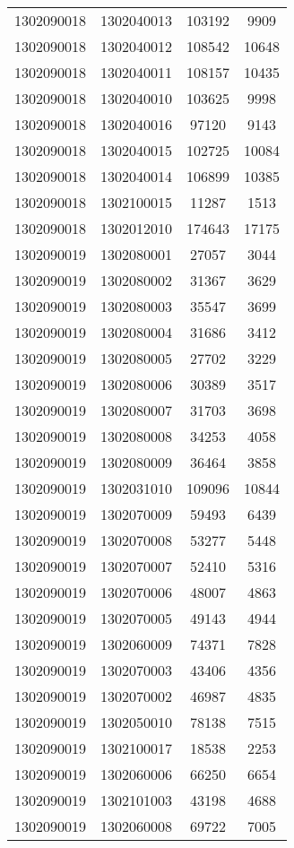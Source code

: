 \begin{longtable}[h]{llcc}
		1302090018 & 1302040013 & 103192 & 9909\\
		1302090018 & 1302040012 & 108542 & 10648\\
		1302090018 & 1302040011 & 108157 & 10435\\
		1302090018 & 1302040010 & 103625 & 9998\\
		1302090018 & 1302040016 & 97120 & 9143\\
		1302090018 & 1302040015 & 102725 & 10084\\
		1302090018 & 1302040014 & 106899 & 10385\\
		1302090018 & 1302100015 & 11287 & 1513\\
		1302090018 & 1302012010 & 174643 & 17175\\
		1302090019 & 1302080001 & 27057 & 3044\\
		1302090019 & 1302080002 & 31367 & 3629\\
		1302090019 & 1302080003 & 35547 & 3699\\
		1302090019 & 1302080004 & 31686 & 3412\\
		1302090019 & 1302080005 & 27702 & 3229\\
		1302090019 & 1302080006 & 30389 & 3517\\
		1302090019 & 1302080007 & 31703 & 3698\\
		1302090019 & 1302080008 & 34253 & 4058\\
		1302090019 & 1302080009 & 36464 & 3858\\
		1302090019 & 1302031010 & 109096 & 10844\\
		1302090019 & 1302070009 & 59493 & 6439\\
		1302090019 & 1302070008 & 53277 & 5448\\
		1302090019 & 1302070007 & 52410 & 5316\\
		1302090019 & 1302070006 & 48007 & 4863\\
		1302090019 & 1302070005 & 49143 & 4944\\
		1302090019 & 1302060009 & 74371 & 7828\\
		1302090019 & 1302070003 & 43406 & 4356\\
		1302090019 & 1302070002 & 46987 & 4835\\
		1302090019 & 1302050010 & 78138 & 7515\\
		1302090019 & 1302100017 & 18538 & 2253\\
		1302090019 & 1302060006 & 66250 & 6654\\
		1302090019 & 1302101003 & 43198 & 4688\\
		1302090019 & 1302060008 & 69722 & 7005\\

\end{longtable}
